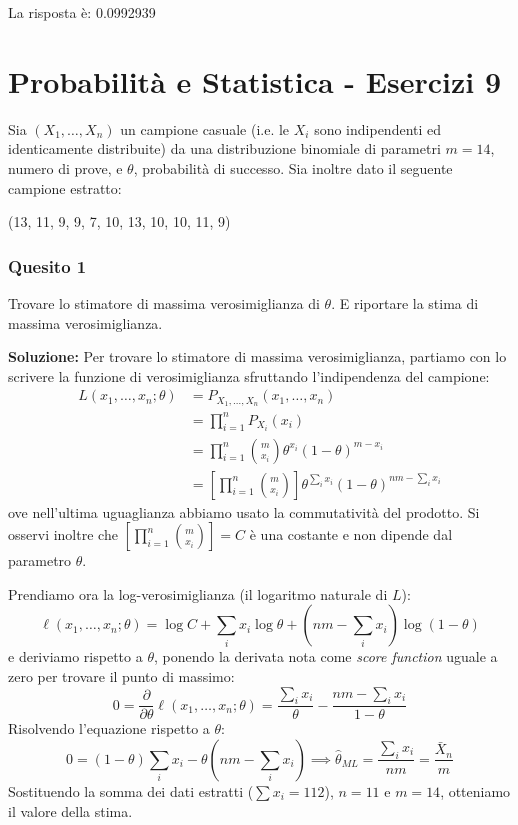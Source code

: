 \documentclass[12pt, a4paper]{article}
\begin{document}
La risposta è: 0.0992939


\newpage
\section*{Probabilità e Statistica - Esercizi 9}

\vspace{0.5cm}
\begin{tcolorbox}[colback=lightergray!10, colframe=tocsec, title=\textbf{Esercizio 1}]
Sia $(X_1,\dots,X_n)$ un campione casuale (i.e. le $X_i$ sono indipendenti ed identicamente distribuite) da una distribuzione binomiale di parametri $m=14$, numero di prove, e $\theta$, probabilità di successo.
Sia inoltre dato il seguente campione estratto:
\begin{center}
(13, 11, 9, 9, 7, 10, 13, 10, 10, 11, 9)
\end{center}
\end{tcolorbox}

\subsubsection*{Quesito 1}
Trovare lo stimatore di massima verosimiglianza di $\theta$. E riportare la stima di massima verosimiglianza.

\textbf{Soluzione:}
Per trovare lo stimatore di massima verosimiglianza, partiamo con lo scrivere la funzione di verosimiglianza sfruttando l'indipendenza del campione:
$$ \begin{aligned} L(x_1, \dots, x_n; \theta) &= P_{X_1, \dots, X_n}(x_1, \dots, x_n) \\ &= \prod_{i=1}^n P_{X_i}(x_i) \\ &= \prod_{i=1}^n \binom{m}{x_i} \theta^{x_i} (1-\theta)^{m-x_i} \\ &= \left[ \prod_{i=1}^n \binom{m}{x_i} \right] \theta^{\sum_i x_i} (1-\theta)^{nm - \sum_i x_i} \end{aligned} $$
ove nell’ultima uguaglianza abbiamo usato la commutatività del prodotto. Si osservi inoltre che $\left[ \prod_{i=1}^n \binom{m}{x_i} \right] = C$ è una costante e non dipende dal parametro $\theta$.

Prendiamo ora la log-verosimiglianza (il logaritmo naturale di $L$):
$$ \ell(x_1, \dots, x_n; \theta) = \log C + \sum_i x_i \log\theta + \left(nm - \sum_i x_i\right)\log(1-\theta) $$
e deriviamo rispetto a $\theta$, ponendo la derivata nota come \textit{score function} uguale a zero per trovare il punto di massimo:
$$ 0 = \frac{\partial}{\partial\theta}\ell(x_1, \dots, x_n; \theta) = \frac{\sum_i x_i}{\theta} - \frac{nm - \sum_i x_i}{1-\theta} $$
Risolvendo l'equazione rispetto a $\theta$:
$$ 0 = (1-\theta)\sum_i x_i - \theta\left(nm - \sum_i x_i\right) \implies \hat{\theta}_{ML} = \frac{\sum_i x_i}{nm} = \frac{\bar{X}_n}{m} $$
Sostituendo la somma dei dati estratti ($\sum x_i = 112$), $n=11$ e $m=14$, otteniamo il valore della stima.
\end{document}

